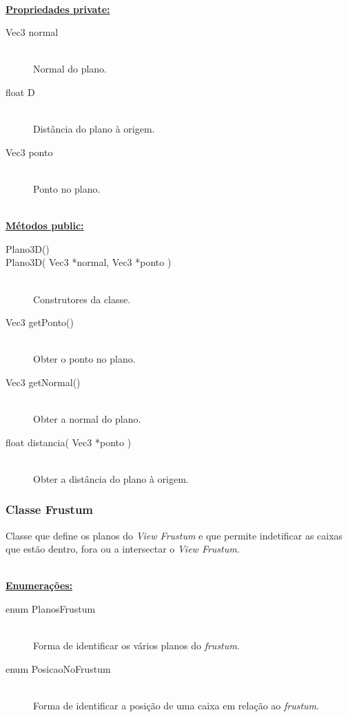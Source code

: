 \documentclass[a5paper,onecolumn, 11pt]{article}
\begin{document}
\hfill \\ \underline{\textbf{Propriedades private:}}

\begin{description}
	\item[Vec3 normal] \hfill \\
	Normal do plano.

	\item[float D] \hfill \\
	Distância do plano à origem.

	\item[Vec3 ponto] \hfill \\
	Ponto no plano.
\end{description}

\hfill \\ \underline{\textbf{Métodos public:}}

\begin{description}
	\item[Plano3D()]
	\item[Plano3D( Vec3 *normal, Vec3 *ponto )] \hfill \\
	Construtores da classe.

	\item[Vec3 getPonto()] \hfill \\
	Obter o ponto no plano.

	\item[Vec3 getNormal()] \hfill \\
	Obter a normal do plano.

	\item[float distancia( Vec3 *ponto )] \hfill \\
	Obter a distância do plano à origem.
\end{description}

\clearpage
\subsubsection{Classe Frustum} \label{classe frustum}
Classe que define os planos do \textit{View Frustum} e que permite indetificar as caixas que estão dentro, fora ou a intersectar o \textit{View Frustum}.

\hfill \\ \underline{\textbf{Enumerações:}}

\begin{description}
	\item[enum PlanosFrustum] \hfill \\
	Forma de identificar os vários planos do \textit{frustum}.
	\item[enum PosicaoNoFrustum] \hfill \\
	Forma de identificar a posição de uma caixa em relação ao \textit{frustum}.
\end{description}
\end{document}
